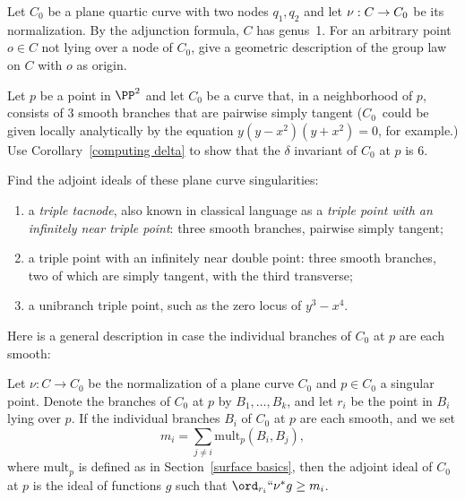 \begin{exercise}
Let $C_0$ be a
plane quartic curve
%
%
with two nodes $q_1, q_2$
and
let $\nu :\nobreak C \to C_0$ be its normalization.
%
By the adjunction formula, $C$ has genus~1.
For an arbitrary point
$o \in C$ not
lying over a node of $C_0$,
 give a geometric description
of the
group law
%
on $C$ with $o$ as origin.
\end{exercise}

\begin{exercise}
Let $p$ be a point in $\PP^{2}$ and let $C_{0}$ be a curve that, in
a neighborhood of $p$, consists of 3 smooth branches that are
pairwise simply tangent ($C_{0}$~could be given locally analytically
by the equation $y(y-x^{2})(y+x^{2})=0$, for example.) Use
Corollary~\ref{computing delta} to show that the $\delta$ invariant
of $C_{0}$ at $p$ is 6.
\end{exercise}

\begin{exercise}
Find the
adjoint ideals
%
of these plane curve singularities:
\begin{enumerate}
\item a
\emph{triple tacnode},
also known in classical language as
a \emph{triple point with an}
\emph{infinitely near triple point}:
%
three smooth branches, pairwise simply
%
%
tangent;
\item a triple point with an infinitely near double point: three smooth
branches, two of which are simply tangent, with the third transverse;
\item a
unibranch triple point,
such as the zero locus of $y^3-x^4$.
%
%
\end{enumerate}
\end{exercise}

Here is a  general description in case the individual branches of $C_0$
at $p$ are each smooth:

\begin{exercise}
Let $\nu : C \to C_0$ be the normalization of a plane curve $C_0$ and
%
$p \in C_0$ a singular point. Denote the branches of $C_0$ at $p$ by
$B_1,\dots,B_k$, and let $r_i$ be the point in $B_i$ lying over $p$. If
the individual branches $B_i$ of $C_0$ at $p$ are each smooth, and we set
$$
m_i = \sum_{j \neq i} \mathrm{mult}_p(B_i,  B_j),
$$
where $\mathrm{mult}_{p}$ is defined as in Section~\ref{surface basics}, then the adjoint ideal of $C_0$ at $p$ is the ideal of functions $g$
such that $\ord_{r_i}` `\nu^*g \geq m_i$.
\end{exercise}


